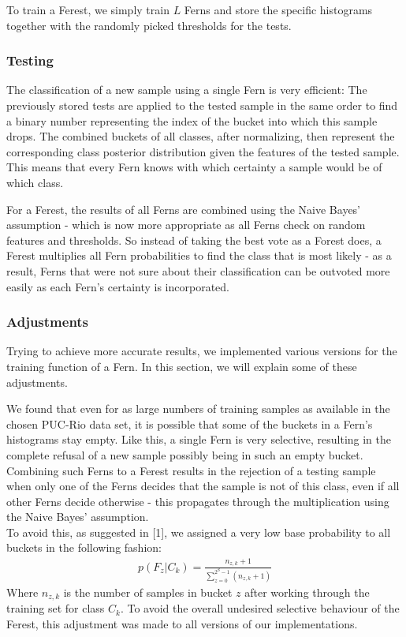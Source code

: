 \documentclass[twocolumn]{article}
\begin{document}
To train a Ferest, we simply train $L$ Ferns and store the specific histograms together with the randomly picked thresholds for the tests.

\subsubsection{Testing}

The classification of a new sample using a single Fern is very efficient: The previously stored tests are applied to the tested sample in the same order to find a binary number representing the index of the bucket into which this sample drops. The combined buckets of all classes, after normalizing, then represent the corresponding class posterior distribution given the features of the tested sample. This means that every Fern knows with which certainty a sample would be of which class.

For a Ferest, the results of all Ferns are combined using the Naive Bayes' assumption - which is now more appropriate as all Ferns check on random features and thresholds. So instead of taking the best vote as a Forest does, a Ferest multiplies all Fern probabilities to find the class that is most likely - as a result, Ferns that were not sure about their classification can be outvoted more easily as each Fern's certainty is incorporated.

\subsubsection{Adjustments}

Trying to achieve more accurate results, we implemented various versions for the training function of a Fern. In this section, we will explain some of these adjustments.

We found that even for as large numbers of training samples as available in the chosen PUC-Rio data set, it is possible that some of the buckets in a Fern's histograms stay empty. Like this, a single Fern is very selective, resulting in the complete refusal of a new sample possibly being in such an empty bucket. Combining such Ferns to a Ferest results in the rejection of a testing sample when only one of the Ferns decides that the sample is not of this class, even if all other Ferns decide otherwise - this propagates through the multiplication using the Naive Bayes' assumption.\\
To avoid this, as suggested in [1], we assigned a very low base probability to all buckets in the following fashion:
\begin{align*}
p(F_z\vert C_k) = \frac{n_{z,k}+1}{\sum_{z=0}^{2^S-1}(n_{z,k}+1)}
\end{align*}
Where $n_{z,k}$ is the number of samples in bucket $z$ after working through the training set for class $C_k$. To avoid the overall undesired selective behaviour of the Ferest, this adjustment was made to all versions of our implementations.\\
\end{document}
